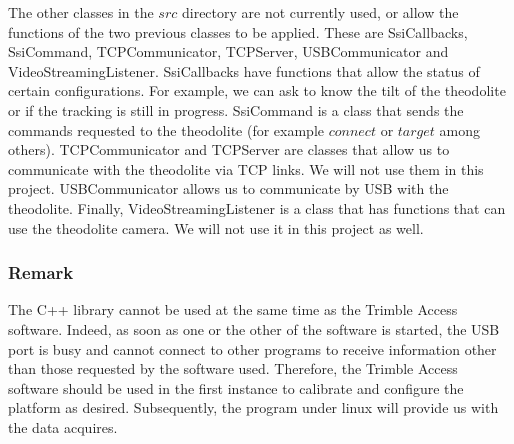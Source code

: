 \documentclass[10pt,letterpaper,oneside]{article}
\begin{document}
The other classes in the $src$ directory are not currently used, or allow the functions of the two previous classes to be applied.
These are SsiCallbacks, SsiCommand, TCPCommunicator, TCPServer, USBCommunicator and
VideoStreamingListener.
SsiCallbacks have functions that allow the status of certain configurations.
For example, we can ask to know the tilt of the theodolite or if the tracking is still in progress.
SsiCommand is a class that sends the commands requested to the theodolite (for example $connect$ or $target$ among others).
TCPCommunicator and TCPServer are classes that allow us to communicate with the theodolite via TCP links.
We will not use them in this project.
USBCommunicator allows us to communicate by USB with the theodolite.
Finally, VideoStreamingListener is a class that has functions that can use the theodolite camera.
We will not use it in this project as well.


\subsubsection{Remark}

The C++ library cannot be used at the same time as the Trimble Access software.
Indeed, as soon as one or the other of the software is started, the USB port is busy and cannot connect to other programs to receive information other than those requested by the software used.
Therefore, the Trimble Access software should be used in the first instance to calibrate and configure the platform as desired.
Subsequently, the program under linux will provide us with the data acquires.
\end{document}
